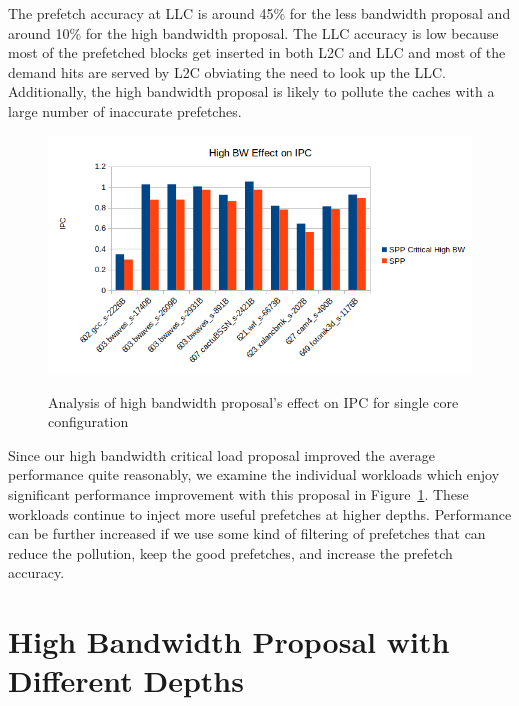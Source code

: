 The prefetch accuracy at LLC is around 45\% for the less bandwidth proposal and around 10\% for the high bandwidth proposal. The LLC accuracy is low because most of the prefetched blocks get inserted in both L2C and LLC and most of the demand hits are served by L2C obviating the need to look up the LLC. Additionally, the high bandwidth proposal is likely to pollute the caches with a large number of inaccurate prefetches.
\begin{figure}[H]
{\includegraphics[scale=0.6]{images/Depth_critical workloads.png}}
\caption{Analysis of high bandwidth proposal's effect on IPC for single core configuration}
\label{fig:high-bw-analysis}
\end{figure}

Since our high bandwidth critical load proposal improved the average performance quite reasonably, we examine the individual workloads
which enjoy significant performance improvement with this proposal in Figure~\ref{fig:high-bw-analysis}. These workloads continue to inject more useful prefetches at higher depths. Performance can be further increased if we use some kind of filtering of prefetches that can reduce the pollution, keep the good prefetches, and increase the prefetch accuracy.

\section{High Bandwidth Proposal with Different Depths}

